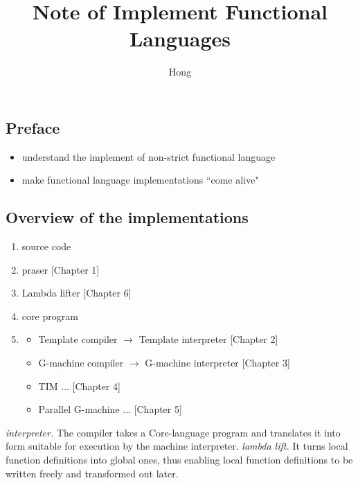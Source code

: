 \documentclass [11pt, a4paper]{article}
\title{Note of Implement Functional Languages}
\author{Hong}
\begin{document}
    \maketitle
    \tableofcontents
    \begin{flushleft}
    \newpage 
    \section{Preface}
    \begin{itemize}
        \item understand the implement of non-strict functional language
        \item make functional language implementations ``come alive"
    \end{itemize}

    \subsection{Overview of the implementations}
    \begin{enumerate}
        \item source code
        \item praser  [Chapter 1]
        \item Lambda lifter [Chapter 6]
        \item core program
        \item   \begin{itemize}
                    \item Template compiler  $\rightarrow$ Template interpreter     [Chapter 2]
                    \item G-machine compiler $\rightarrow$ G-machine interpreter    [Chapter 3]
                    \item TIM ...       [Chapter 4]
                    \item Parallel G-machine ...        [Chapter 5]
                \end{itemize}
    \end{enumerate}
    
    
        \emph{interpreter.} The compiler takes a Core-language program and translates it into form suitable for execution by the machine interpreter.
        \newline
        \newline \emph{lambda lift.} It turns local function definitions into global ones, thus enabling local function definitions to be written freely and transformed out later.



\end{flushleft}
\end{document}
